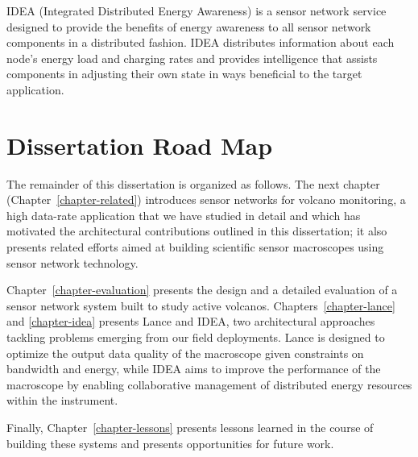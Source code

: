 \begin{itemize}
IDEA (Integrated Distributed Energy Awareness) is a sensor network service
designed to provide the benefits of energy awareness to all sensor network
components in a distributed fashion. IDEA distributes information about each
node's energy load and charging rates and provides intelligence that assists
components in adjusting their own state in ways beneficial to the target
application.

\end{itemize}

\section{Dissertation Road Map}

The remainder of this dissertation is organized as follows. The next chapter
(Chapter~\ref{chapter-related}) introduces sensor networks for volcano
monitoring, a high data-rate application that we have studied in detail and
which has motivated the architectural contributions outlined in this
dissertation; it also presents related efforts aimed at building scientific
sensor macroscopes using sensor network technology.

Chapter~\ref{chapter-evaluation} presents the design and a detailed
evaluation of a sensor network system built to study active volcanos.
Chapters~\ref{chapter-lance} and \ref{chapter-idea} presents Lance and IDEA,
two architectural approaches tackling problems emerging from our field
deployments. Lance is designed to optimize the output data quality of the
macroscope given constraints on bandwidth and energy, while IDEA aims to
improve the performance of the macroscope by enabling collaborative
management of distributed energy resources within the instrument.

Finally, Chapter~\ref{chapter-lessons} presents lessons learned in the course
of building these systems and presents opportunities for future work.
